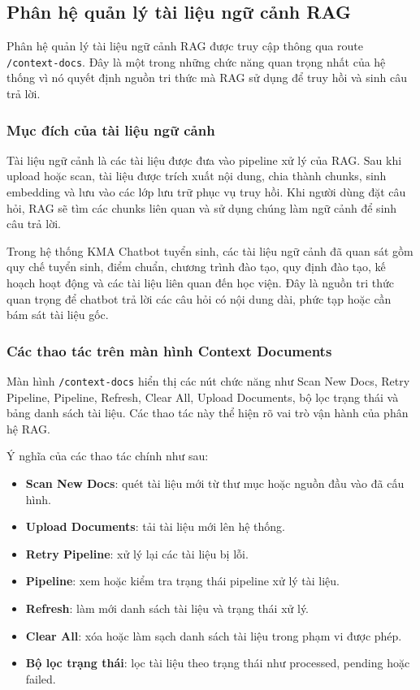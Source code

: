 \subsection{Phân hệ quản lý tài liệu ngữ cảnh RAG}

Phân hệ quản lý tài liệu ngữ cảnh RAG được truy cập thông qua route \texttt{/context-docs}. Đây là một trong những chức năng quan trọng nhất của hệ thống vì nó quyết định nguồn tri thức mà RAG sử dụng để truy hồi và sinh câu trả lời.

\subsubsection{Mục đích của tài liệu ngữ cảnh}

Tài liệu ngữ cảnh là các tài liệu được đưa vào pipeline xử lý của RAG. Sau khi upload hoặc scan, tài liệu được trích xuất nội dung, chia thành chunks, sinh embedding và lưu vào các lớp lưu trữ phục vụ truy hồi. Khi người dùng đặt câu hỏi, RAG sẽ tìm các chunks liên quan và sử dụng chúng làm ngữ cảnh để sinh câu trả lời.

Trong hệ thống KMA Chatbot tuyển sinh, các tài liệu ngữ cảnh đã quan sát gồm quy chế tuyển sinh, điểm chuẩn, chương trình đào tạo, quy định đào tạo, kế hoạch hoạt động và các tài liệu liên quan đến học viện. Đây là nguồn tri thức quan trọng để chatbot trả lời các câu hỏi có nội dung dài, phức tạp hoặc cần bám sát tài liệu gốc.

\subsubsection{Các thao tác trên màn hình Context Documents}

Màn hình \texttt{/context-docs} hiển thị các nút chức năng như Scan New Docs, Retry Pipeline, Pipeline, Refresh, Clear All, Upload Documents, bộ lọc trạng thái và bảng danh sách tài liệu. Các thao tác này thể hiện rõ vai trò vận hành của phân hệ RAG.

Ý nghĩa của các thao tác chính như sau:

\begin{itemize}
    \item \textbf{Scan New Docs}: quét tài liệu mới từ thư mục hoặc nguồn đầu vào đã cấu hình.
    \item \textbf{Upload Documents}: tải tài liệu mới lên hệ thống.
    \item \textbf{Retry Pipeline}: xử lý lại các tài liệu bị lỗi.
    \item \textbf{Pipeline}: xem hoặc kiểm tra trạng thái pipeline xử lý tài liệu.
    \item \textbf{Refresh}: làm mới danh sách tài liệu và trạng thái xử lý.
    \item \textbf{Clear All}: xóa hoặc làm sạch danh sách tài liệu trong phạm vi được phép.
    \item \textbf{Bộ lọc trạng thái}: lọc tài liệu theo trạng thái như processed, pending hoặc failed.
\end{itemize}

